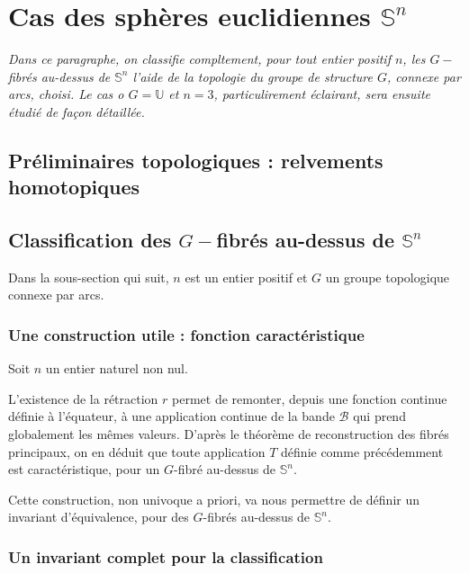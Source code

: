\section{Cas des sph\`eres euclidiennes $\mathbb{S}^n$}

\emph{%
Dans ce paragraphe, on classifie compltement, pour tout entier positif $n$, les $G-$fibr\'es au-dessus de $\mathbb{S}^n$ %
 l'aide de la topologie du groupe de structure $G$, connexe par arcs, choisi. %
Le cas o $G=\mathbb{U}$ et $n=3$, particulirement \'eclairant, sera ensuite \'etudi\'e de fa\c con d\'etaill\'ee.%
}


\subsection{Pr\'eliminaires topologiques : relvements homotopiques}


\subsection{Classification des $G-$fibr\'es au-dessus de $\mathbb{S}^n$}

Dans la sous-section qui suit, $n$ est un entier positif et $G$ un groupe topologique connexe par arcs.

\subsubsection{Une construction utile : fonction caract\'eristique}

Soit $n$ un entier naturel non nul.


\dotfill

L'existence de la rétraction $r$ permet de remonter, depuis une fonction continue définie à l'équateur, %
à une application continue de la bande $\mathcal{B}$ qui prend globalement les mêmes valeurs. %
D'après le théorème de reconstruction des fibrés principaux, %
on en déduit que toute application $T$ définie comme précédemment est caractéristique, pour un $G$-fibré au-dessus de $\mathbb{S}^n$.
\par
Cette construction, non univoque a priori, va nous permettre de définir un invariant d'équivalence, pour des $G$-fibrés au-dessus de $\mathbb{S}^n$.

\subsubsection{Un invariant complet pour la classification}

